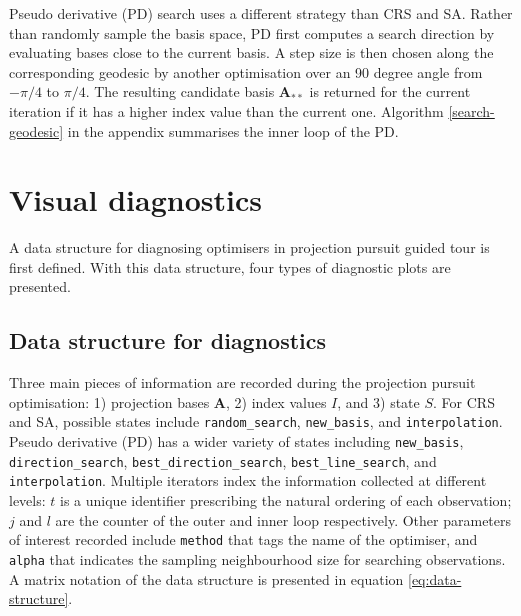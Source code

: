 Pseudo derivative (PD) search uses a different strategy than CRS and SA.
Rather than randomly sample the basis space, PD first computes a search
direction by evaluating bases close to the current basis. A step size is
then chosen along the corresponding geodesic by another optimisation
over an 90 degree angle from \(-\pi/4\) to \(\pi/4\). The resulting
candidate basis \(\mathbf{A}_{**}\) is returned for the current
iteration if it has a higher index value than the current one. Algorithm
\ref{search-geodesic} in the appendix summarises the inner loop of the
PD.

\hypertarget{vis-diag}{%
\section{Visual diagnostics}\label{vis-diag}}

A data structure for diagnosing optimisers in projection pursuit guided
tour is first defined. With this data structure, four types of
diagnostic plots are presented.

\hypertarget{data-structure-for-diagnostics}{%
\subsection{Data structure for
diagnostics}\label{data-structure-for-diagnostics}}

Three main pieces of information are recorded during the projection
pursuit optimisation: 1) projection bases \(\mathbf{A}\), 2) index
values \(I\), and 3) state \(S\). For CRS and SA, possible states
include \texttt{random\_search}, \texttt{new\_basis}, and
\texttt{interpolation}. Pseudo derivative (PD) has a wider variety of
states including \texttt{new\_basis}, \texttt{direction\_search},
\texttt{best\_direction\_search}, \texttt{best\_line\_search}, and
\texttt{interpolation}. Multiple iterators index the information
collected at different levels: \(t\) is a unique identifier prescribing
the natural ordering of each observation; \(j\) and \(l\) are the
counter of the outer and inner loop respectively. Other parameters of
interest recorded include \texttt{method} that tags the name of the
optimiser, and \texttt{alpha} that indicates the sampling neighbourhood
size for searching observations. A matrix notation of the data structure
is presented in equation \ref{eq:data-structure}.

